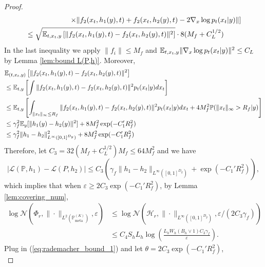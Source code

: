 \documentclass[11pt]{article}
\numberwithin{equation}{section}
\newcommand{\Pmeta}{\mathbb{P}_{\text{meta}}}
\renewcommand{\P}{\mathbb{P}}
\renewcommand{\eqref}[1]{(\ref{#1})}
\begin{document}
\begin{proof}
\begin{equation}
\begin{aligned}
        &\qquad\qquad\qquad  \left.\times\|f_2(x_t,h_1(y),t)+f_2(x_t,h_2(y),t)-2\nabla_x\log p_t(x_t|y)\|\right] \\
        &\leq \sqrt{\mathbb{E}_{t,x_t,y} \left[\|f_2(x_t,h_1(y),t)-f_2(x_t,h_2(y),t)\|^2\right]}\cdot 8(M_f+C_L^{1/2}) \\
        \end{aligned}
    \end{equation}
    In the last inequality we apply $\|f_i\|\leq M_f$ and $\mathbb{E}_{t,x_t,y}\|\nabla_x\log p_t(x_t|y)\|^2\leq C_L$ by Lemma \ref{lem:bound L(P,h)}. 
    Moreover,
    \begin{equation}
        \begin{aligned}
            &\E_{(t,x_t,y)}\left[\|f_2(x_t,h_1(y),t)-f_2(x_t,h_2(y),t)\|^2\right] \\
            &\leq \E_{t,y} \left[\int \|f_2(x_t,h_1(y),t)-f_2(x_t,h_2(y),t)\|^2 p_t(x_t|y)dx_t\right] \\
            &\leq \E_{t,y} \left[\int_{\|x_t\|_\infty\leq R_f} \|f_2(x_t,h_1(y),t)-f_2(x_t,h_2(y),t)\|^2 p_t(x_t|y)dx_t + 4M_f^2\P(\|x_t\|_\infty>R_f|y)\right] \\
            &\leq \gamma_f^2 \E_y[\|h_1(y)-h_2(y)\|^2]+8M_f^2\exp(-C_1'R_f^2) \\
            &\leq \gamma_f^2\|h_1-h_2\|^2_{L^\infty([0,1]^{D_y})}+8M_f^2\exp(-C_1'R_f^2)
        \end{aligned}
    \end{equation}
    Therefore, let $C_3=32(M_f+C_L^{1/2})M_f\leq 64M_f^2$ and we have
    \begin{equation}
        |\mathcal{L}(\P,h_1)-\mathcal{L}(P,h_2)|\leq C_3\left(\gamma_f \|h_1-h_2\|_{L^\infty([0,1]^{D_y})}+\exp(-C_1'R_f^2)\right),
    \end{equation}
    which implies that when $\varepsilon\geq 2C_3\exp(-C_1'R_f^2)$, by Lemma \ref{lem:covering_num},
    \begin{equation}
        \begin{aligned}
            \log\mathcal{N}(\Phi_r,\|\cdot\|_{L^2(\Pmeta^{(K)})},\varepsilon)
            &\leq \log\mathcal{N}(\mathcal{H}_r,\|\cdot\|_{L^\infty([0,1]^{D_y})},\varepsilon/(2C_3\gamma_f))\\
            &\leq C_4S_hL_h\log\left(\frac{L_hW_h(B_h\vee 1)C_3\gamma_f}{\varepsilon}\right).
        \end{aligned}
    \end{equation}
    Plug in \eqref{eq:rademacher_bound_1} and let $\theta=2C_3\exp(-C_1'R_f^2)$,
    \begin{equation}

\end{equation}
\end{proof}
\end{document}
